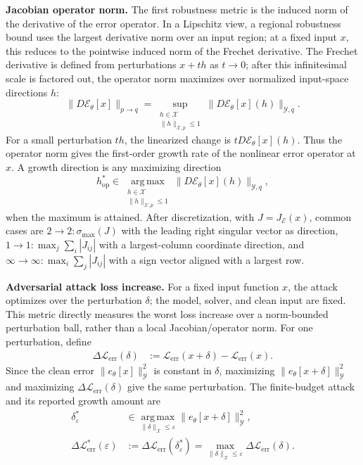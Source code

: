 \documentclass[letterpaper]{article} %
\begin{document}
\smallskip
\noindent\textbf{Jacobian operator norm.}
The first robustness metric is the induced norm of the derivative of the
error operator. In a Lipschitz view, a regional robustness bound uses the
largest derivative norm over an input region; at a fixed input $x$, this reduces
to the pointwise induced norm of the Frechet derivative. The Frechet derivative
is defined from perturbations $x+t h$ as $t\to0$; after this infinitesimal scale
is factored out, the operator norm maximizes over normalized input-space
directions $h$:
\begin{equation}
  \|D\mathcal{E}_\theta[x]\|_{p\to q}
  =
  \sup_{\substack{h\in\mathcal{X}\\ \|h\|_{\mathcal{X},p}\le 1}}
  \|D\mathcal{E}_\theta[x](h)\|_{\mathcal{Y},q}.
\end{equation}
For a small perturbation $t h$, the linearized change is
$tD\mathcal{E}_\theta[x](h)$. Thus the operator norm gives the first-order
growth rate of the nonlinear error operator at $x$. A growth direction is any
maximizing direction
\begin{equation}
  h_{\mathrm{op}}^*
  \in
  \operatorname*{arg\,max}_{\substack{h\in\mathcal{X}\\ \|h\|_{\mathcal{X},p}\le 1}}
  \|D\mathcal{E}_\theta[x](h)\|_{\mathcal{Y},q},
\end{equation}
when the maximum is attained. After discretization, with
$J=J_{\mathcal{E}}(x)$, common cases are
$2\to2:\sigma_{\max}(J)$ with the leading right singular vector as direction,
$1\to1:\max_j\sum_i|J_{ij}|$ with a largest-column coordinate direction, and
$\infty\to\infty:\max_i\sum_j|J_{ij}|$ with a sign vector aligned with a
largest row.

\smallskip
\noindent\textbf{Adversarial attack loss increase.}
For a fixed input function $x$, the attack optimizes over the perturbation
$\delta$; the model, solver, and clean input are fixed. This metric directly
measures the worst loss increase over a norm-bounded perturbation ball, rather
than a local Jacobian/operator norm. For one perturbation, define
\begin{align}
  \Delta\mathcal{L}_{\mathrm{err}}(\delta)
  &:=
  \mathcal{L}_{\mathrm{err}}(x+\delta)
  -
  \mathcal{L}_{\mathrm{err}}(x).
\end{align}
Since the clean error $\|e_\theta[x]\|_{\mathcal{Y}}^2$ is constant in
$\delta$, maximizing $\|e_\theta[x+\delta]\|_{\mathcal{Y}}^2$ and maximizing
$\Delta\mathcal{L}_{\mathrm{err}}(\delta)$ give the same perturbation. The
finite-budget attack and its reported growth amount are
\begin{align}
  \delta_\varepsilon^*
  &\in
  \operatorname*{arg\,max}_{\|\delta\|_{\mathcal{X}}\le\varepsilon}
  \|e_\theta[x+\delta]\|_{\mathcal{Y}}^2,
  \nonumber\\
  \Delta\mathcal{L}_{\mathrm{err}}^*(\varepsilon)
  &:=
  \Delta\mathcal{L}_{\mathrm{err}}(\delta_\varepsilon^*)
  =
  \max_{\|\delta\|_{\mathcal{X}}\le\varepsilon}
  \Delta\mathcal{L}_{\mathrm{err}}(\delta).
\end{align}
\end{document}
